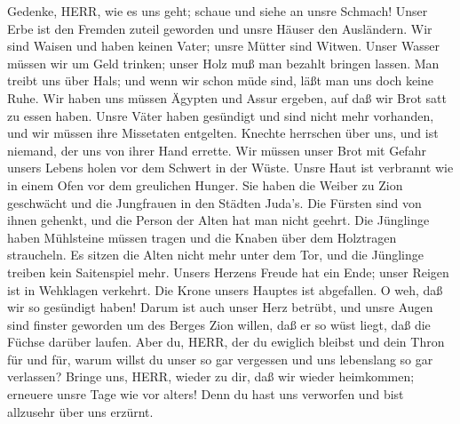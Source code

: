  Gedenke, HERR, wie es uns geht; schaue und siehe an unsre
Schmach!  Unser Erbe ist den Fremden zuteil geworden und
unsre Häuser den Ausländern.  Wir sind Waisen und haben
keinen Vater; unsre Mütter sind Witwen.  Unser Wasser müssen
wir um Geld trinken; unser Holz muß man bezahlt bringen lassen.
 Man treibt uns über Hals; und wenn wir schon müde sind,
läßt man uns doch keine Ruhe.  Wir haben uns müssen Ägypten
und Assur ergeben, auf daß wir Brot satt zu essen haben. 
Unsre Väter haben gesündigt und sind nicht mehr vorhanden, und wir
müssen ihre Missetaten entgelten.  Knechte herrschen über
uns, und ist niemand, der uns von ihrer Hand errette.  Wir
müssen unser Brot mit Gefahr unsers Lebens holen vor dem Schwert in der
Wüste.  Unsre Haut ist verbrannt wie in einem Ofen vor dem
greulichen Hunger.  Sie haben die Weiber zu Zion geschwächt
und die Jungfrauen in den Städten Juda's.  Die Fürsten sind
von ihnen gehenkt, und die Person der Alten hat man nicht geehrt.
 Die Jünglinge haben Mühlsteine müssen tragen und die
Knaben über dem Holztragen straucheln.  Es sitzen die Alten
nicht mehr unter dem Tor, und die Jünglinge treiben kein Saitenspiel
mehr.  Unsers Herzens Freude hat ein Ende; unser Reigen ist
in Wehklagen verkehrt.  Die Krone unsers Hauptes ist
abgefallen. O weh, daß wir so gesündigt haben!  Darum ist
auch unser Herz betrübt, und unsre Augen sind finster geworden
 um des Berges Zion willen, daß er so wüst liegt, daß die
Füchse darüber laufen.  Aber du, HERR, der du ewiglich
bleibst und dein Thron für und für,  warum willst du unser
so gar vergessen und uns lebenslang so gar verlassen? 
Bringe uns, HERR, wieder zu dir, daß wir wieder heimkommen; erneuere
unsre Tage wie vor alters!  Denn du hast uns verworfen und
bist allzusehr über uns erzürnt.
